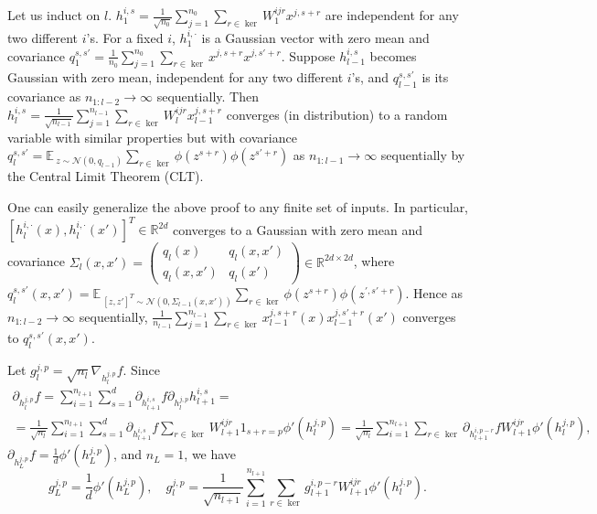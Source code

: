 \documentclass{article}
\newcommand{\EE}{\mathbb{E}\,}
\newcommand{\RR}{\mathbb{R}}
\newcommand{\NN}{\mathcal{N}}
\begin{document}
    Let us induct on $l$.
    $h_1^{i,s} = \frac{1}{\sqrt{n_0}} \sum_{j=1}^{n_0} \sum_{r \in \ker} W_1^{ijr} x^{j,s+r}$ are independent for any two different $i$'s.
    For a fixed $i$, $h_1^{i,\cdot}$ is a Gaussian vector with zero mean and covariance $q_1^{s,s'} = \frac{1}{n_0} \sum_{j=1}^{n_0} \sum_{r \in \ker} x^{j,s+r} x^{j,s'+r}$.
    Suppose $h_{l-1}^{i,s}$ becomes Gaussian with zero mean, independent for any two different $i$'s, and $q_{l-1}^{s,s'}$ is its covariance as $n_{1:l-2} \to \infty$ sequentially.
    Then $h_l^{i,s} = \frac{1}{\sqrt{n_{l-1}}} \sum_{j=1}^{n_{l-1}} \sum_{r \in \ker} W_l^{ijr} x_{l-1}^{j,s+r}$ converges (in distribution) to a random variable with similar properties but with covariance $q_l^{s,s'} = \EE_{z \sim \NN(0,q_{l-1})} \sum_{r \in \ker} \phi(z^{s+r}) \phi(z^{s'+r})$ as $n_{1:l-1} \to \infty$ sequentially by the Central Limit Theorem (CLT).

    One can easily generalize the above proof to any finite set of inputs.
    In particular, $[h_l^{i,\cdot}(x),h_l^{i,\cdot}(x')]^T \in \RR^{2d}$ converges to a Gaussian with zero mean and covariance $\Sigma_l(x,x') = \begin{pmatrix} q_l(x) & q_l(x,x')\\q_l(x,x') & q_l(x') \end{pmatrix} \in \RR^{2d \times 2d}$, where $q_l^{s,s'}(x,x') = \EE_{[z,z']^T \sim \NN(0,\Sigma_{l-1}(x,x'))} \sum_{r \in \ker} \phi(z^{s+r}) \phi(z^{\prime,s'+r})$.
    Hence as $n_{1:l-2} \to \infty$ sequentially, $\frac{1}{n_{l-1}} \sum_{j=1}^{n_{l-1}} \sum_{r \in \ker} x_{l-1}^{j,s+r}(x) x_{l-1}^{j,s'+r}(x')$ converges to $q_l^{s,s'}(x,x')$.

    Let $g_l^{j,p} = \sqrt{n_l} \nabla_{h_l^{j,p}} f$.
    Since
    \begin{multline}
        \partial_{h_l^{j,p}} f 
        = \sum_{i=1}^{n_{l+1}} \sum_{s=1}^d \partial_{h_{l+1}^{i,s}} f \partial_{h_l^{j,p}} h_{l+1}^{i,s} 
        =\\= \frac{1}{\sqrt{n_l}} \sum_{i=1}^{n_{l+1}} \sum_{s=1}^d \partial_{h_{l+1}^{i,s}} f \sum_{r \in \ker} W_{l+1}^{ijr} 1_{s+r=p} \phi'(h_l^{j,p})
        = \frac{1}{\sqrt{n_l}} \sum_{i=1}^{n_{l+1}} \sum_{r \in \ker} \partial_{h_{l+1}^{i,p-r}} f W_{l+1}^{ijr} \phi'(h_l^{j,p}),
    \end{multline}
    $\partial_{h_L^{j,p}} f = \frac{1}{d} \phi'(h_L^{j,p})$, and $n_L=1$, we have
    \begin{equation}
        g_L^{j,p}
        = \frac{1}{d} \phi'(h_L^{j,p}),
        \quad
        g_l^{j,p}
        = \frac{1}{\sqrt{n_{l+1}}} \sum_{i=1}^{n_{l+1}} \sum_{r \in \ker} g_{l+1}^{i,p-r} W_{l+1}^{ijr} \phi'(h_l^{j,p}).
    \end{equation}
\end{document}
